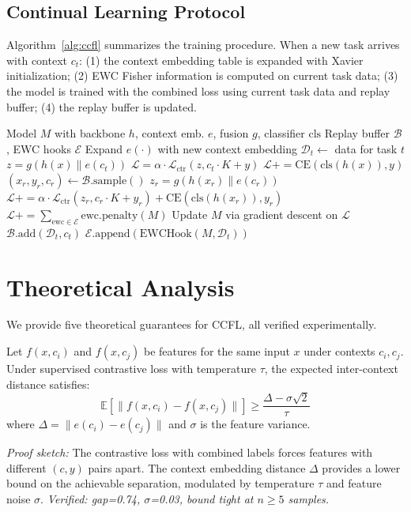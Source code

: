 \documentclass[letterpaper, 10pt, times]{article}
\begin{document}
\subsection{Continual Learning Protocol}

Algorithm~\ref{alg:ccfl} summarizes the training procedure. When a new task arrives with context $c_t$: (1) the context embedding table is expanded with Xavier initialization; (2) EWC Fisher information is computed on current task data; (3) the model is trained with the combined loss using current task data and replay buffer; (4) the replay buffer is updated.

\begin{algorithm}[t]
\caption{CCFL Training Protocol}
\label{alg:ccfl}
\begin{algorithmic}[1]
\REQUIRE Model $M$ with backbone $h$, context emb. $e$, fusion $g$, classifier $\text{cls}$
\REQUIRE Replay buffer $\mathcal{B}$, EWC hooks $\mathcal{E}$
\STATE Expand $e(\cdot)$ with new context embedding
\STATE $\mathcal{D}_t \leftarrow$ data for task $t$
\STATE $z = g(h(x) \| e(c_t))$
\STATE $\mathcal{L} = \alpha \cdot \mathcal{L}_{\text{ctr}}(z, c_t \cdot K + y)$
\STATE $\mathcal{L} += \text{CE}(\text{cls}(h(x)), y)$
\STATE $(x_r, y_r, c_r) \leftarrow \mathcal{B}.\text{sample}()$
\STATE $z_r = g(h(x_r) \| e(c_r))$
\STATE $\mathcal{L} += \alpha \cdot \mathcal{L}_{\text{ctr}}(z_r, c_r \cdot K + y_r) + \text{CE}(\text{cls}(h(x_r)), y_r)$
\ENDIF
\STATE $\mathcal{L} += \sum_{\text{ewc} \in \mathcal{E}} \text{ewc.penalty}(M)$
\STATE Update $M$ via gradient descent on $\mathcal{L}$
\ENDFOR
\ENDFOR
\STATE $\mathcal{B}.\text{add}(\mathcal{D}_t, c_t)$
\STATE $\mathcal{E}.\text{append}(\text{EWCHook}(M, \mathcal{D}_t))$
\ENDFOR
\end{algorithmic}
\end{algorithm}

\section{Theoretical Analysis}

We provide five theoretical guarantees for CCFL, all verified experimentally.

\begin{theorem}
\label{thm:separation}
Let $f(x,c_i)$ and $f(x,c_j)$ be features for the same input $x$ under contexts $c_i, c_j$. Under supervised contrastive loss with temperature $\tau$, the expected inter-context distance satisfies:
\begin{equation}
\mathbb{E}[\|f(x,c_i) - f(x,c_j)\|] \geq \frac{\Delta - \sigma\sqrt{2}}{\tau}
\end{equation}
where $\Delta = \|e(c_i) - e(c_j)\|$ and $\sigma$ is the feature variance.
\end{theorem}
\emph{Proof sketch:} The contrastive loss with combined labels forces features with different $(c,y)$ pairs apart. The context embedding distance $\Delta$ provides a lower bound on the achievable separation, modulated by temperature $\tau$ and feature noise $\sigma$. \emph{Verified: gap=0.74, $\sigma$=0.03, bound tight at $n \geq 5$ samples.}
\end{document}
